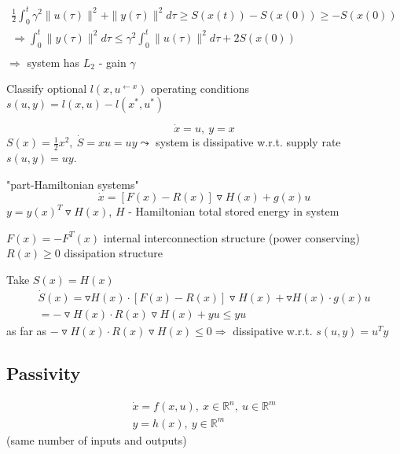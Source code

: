 \begin{equation*}
\begin{split}
\frac{1}{2} \int_0^t \gamma^2 \|u(\tau)\|^2 + \|y(\tau)\|^2d\tau \geq S(x(t)) - S(x(0)) \geq -S(x(0)) \\
\Rightarrow \int_0^t \|y(\tau)\|^2d\tau \leq \gamma^2 \int_0^t \|u(\tau)\|^2d\tau + 2 S(x(0)) \\
\end{split}
\end{equation*}
$\Rightarrow$ system has $L_2$ - gain $\gamma$

Classify optional $l(x,u^{\leftarrow x})$ operating conditions $s(u,y) = l(x,u) - l(x^*,u^*)$ 


\begin{Example}
\begin{equation*}
\dot{x} = u, \ y = x 
\end{equation*}
$S(x) = \frac{1}{2}x^2, \ \dot{S} = xu = uy \leadsto $ system is dissipative w.r.t. supply rate $s(u,y) = uy$.
\end{Example}

\begin{Example}
"part-Hamiltonian systems" 
\begin{equation*}
\dot{x} = [F(x) - R(x)] \triangledown H(x) + g(x)u
\end{equation*}
$y = y(x)^T\triangledown H(x)$, $H$ - Hamiltonian total stored energy in system

$F(x) = -F^T(x)$ internal interconnection structure (power conserving) $R(x) \geq 0$ dissipation structure

Take $S(x) = H(x)$
\begin{equation*}
\begin{split}
\dot{S}(x) = \triangledown H(x) \cdot [F(x) -R(x)]\triangledown H(x) + \triangledown H(x) \cdot g(x)u \\
= - \triangledown H(x) \cdot R(x) \triangledown H(x) + yu \leq yu 
\end{split}
\end{equation*}
as far as $- \triangledown H(x) \cdot R(x) \triangledown H(x) \leq 0 \Rightarrow$ dissipative w.r.t. $s(u,y) = u^Ty$   
\end{Example}

\subsection{Passivity}

\begin{equation}\label{passivity_system}
\begin{split}
\dot{x} = f(x,u), \ x \in \mathbb{R}^n, \ u \in \mathbb{R}^m \\
y = h(x), \ y \in \mathbb{R}^m
\end{split}
\end{equation}
(same number of inputs and outputs)

